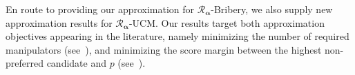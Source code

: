 \documentclass[letterpaper]{article} %
\theoremstyle{definition}
\newcommand{\abs}[1]{\lvert #1 \rvert}
\newcommand\vecgreek{\bm}
\newcommand{\veca}{\vecgreek{\alpha}}
\newcommand{\Ra}{\mathcal{R}_{\veca}}
\begin{document}
En route to providing our approximation for $\Ra$-Bribery, we also supply new approximation results for  $\Ra$-UCM. Our results target both approximation objectives appearing in the literature, namely minimizing the number of required manipulators (see~\cite{DBLP:journals/ai/ZuckermanPR09,DBLP:conf/sigecom/XiaCP10}), and minimizing the score margin between the highest non-preferred candidate and $p$ (see~\cite{DBLP:conf/aaai/BrelsfordFHSS08}).








%
\end{document}
